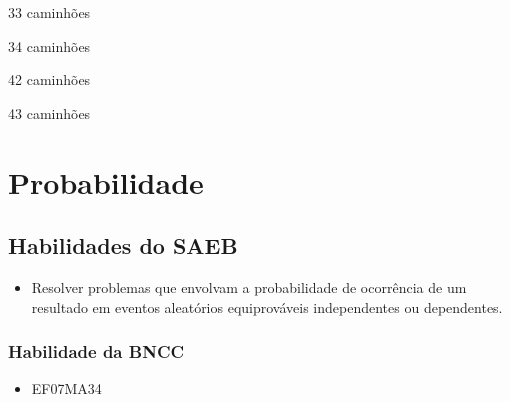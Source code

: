 \begin{multicols}{2}
\begin{escolha}[itemsep=0pt]
\item 33 caminhões
\item 34 caminhões
\item 42 caminhões
\item 43 caminhões
\end{escolha}
\end{multicols}



\chapter{Probabilidade}

\section*{Habilidades do SAEB }
\begin{itemize}
\item Resolver problemas que envolvam a probabilidade de
ocorrência de um resultado em eventos aleatórios equiprováveis
independentes ou dependentes.
\end{itemize}

\subsection{Habilidade da BNCC}
\begin{itemize}
  \item EF07MA34
  \end{itemize}

